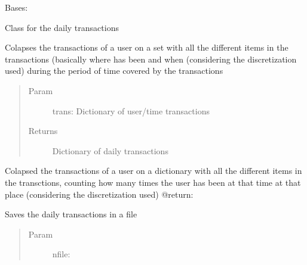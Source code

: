 \documentclass[letterpaper,10pt,english]{sphinxmanual}
\begin{document}
\begin{fulllineitems}
\label{index:SuperHub.Transactions.DailyTransactions}
Bases: {\hyperref[index:SuperHub.Transactions.Transactions]{}}

Class for the daily transactions

\begin{fulllineitems}
\label{index:SuperHub.Transactions.DailyTransactions.colapse}
Colapses the transactions of a user on a set with all the different items
in the transactions (basically where has been and when (considering the
discretization used) during the period of time covered by the transactions
\begin{quote}\begin{description}
\item[{Param }] \leavevmode
trans: Dictionary of user/time transactions

\item[{Returns}] \leavevmode
Dictionary of daily transactions

\end{description}\end{quote}

\end{fulllineitems}


\begin{fulllineitems}
\label{index:SuperHub.Transactions.DailyTransactions.colapse_count}
Colapsed the transactions of a user on a dictionary with all the different items in the
transctions, counting how many times the user has been at that time at that place (considering
the discretization used)
@return:

\end{fulllineitems}


\begin{fulllineitems}
\label{index:SuperHub.Transactions.DailyTransactions.save}
Saves the daily transactions in a file
\begin{quote}\begin{description}
\item[{Param }] \leavevmode
nfile:


\end{description}
\end{quote}
\end{fulllineitems}
\end{fulllineitems}
\end{document}

